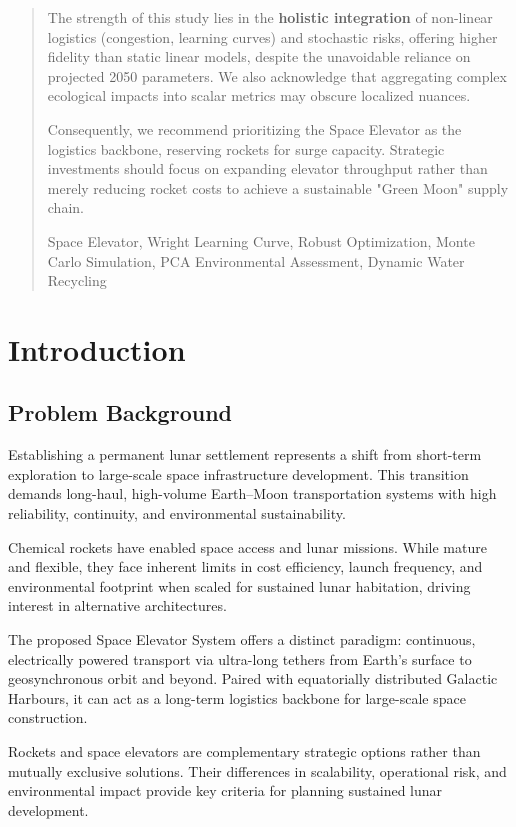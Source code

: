 \documentclass{mcmthesis}
\begin{document}
\begin{abstract}
The strength of this study lies in the \textbf{holistic integration} of non-linear logistics (congestion, learning curves) and stochastic risks, offering higher fidelity than static linear models, despite the unavoidable reliance on projected 2050 parameters. We also acknowledge that aggregating complex ecological impacts into scalar metrics may obscure localized nuances.

Consequently, we recommend prioritizing the Space Elevator as the logistics backbone, reserving rockets for surge capacity. Strategic investments should focus on expanding elevator throughput rather than merely reducing rocket costs to achieve a sustainable "Green Moon" supply chain.

\begin{keywords}
Space Elevator, Wright Learning Curve, Robust Optimization, Monte Carlo Simulation, PCA Environmental Assessment, Dynamic Water Recycling
\end{keywords}

\end{abstract}
\maketitle

\begin{spacing}{0.9}
\tableofcontents
\end{spacing}
\newpage

\section{Introduction}
\subsection{Problem Background}

\par Establishing a permanent lunar settlement represents a shift from short-term exploration to large-scale space infrastructure development. This transition demands long-haul, high-volume Earth–Moon transportation systems with high reliability, continuity, and environmental sustainability.
\par Chemical rockets have enabled space access and lunar missions. While mature and flexible, they face inherent limits in cost efficiency, launch frequency, and environmental footprint when scaled for sustained lunar habitation, driving interest in alternative architectures.
\par The proposed Space Elevator System offers a distinct paradigm: continuous, electrically powered transport via ultra-long tethers from Earth’s surface to geosynchronous orbit and beyond. Paired with equatorially distributed Galactic Harbours, it can act as a long-term logistics backbone for large-scale space construction.
\par Rockets and space elevators are complementary strategic options rather than mutually exclusive solutions. Their differences in scalability, operational risk, and environmental impact provide key criteria for planning sustained lunar development.
\end{document}
